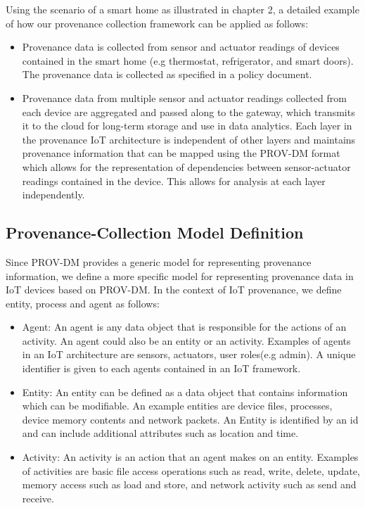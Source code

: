 Using the scenario of a smart home as illustrated in chapter 2, a detailed example of how our provenance collection framework can be applied as follows:

\begin{itemize}

\item Provenance data is collected from sensor and actuator readings of devices contained in the smart home (e.g thermostat, refrigerator, and smart doors). The provenance data is collected as specified in a policy document. 

\item Provenance data from multiple sensor and actuator readings collected from each device are aggregated and passed along to the gateway, which transmits it to the cloud for long-term storage and use in data analytics. Each layer in the provenance IoT architecture is independent of other layers and maintains provenance information that can be mapped using the PROV-DM format which allows for the representation of dependencies between sensor-actuator readings contained in the device. This allows for analysis at each layer independently. 

\end{itemize}





\subsection{Provenance-Collection Model Definition}

 Since PROV-DM provides a generic model for representing provenance information, we define a more specific model for representing provenance data in IoT devices based on  PROV-DM. In the context of IoT provenance, we define entity, process and agent as follows:

\begin{itemize}

\item Agent: An agent is any data object that is responsible for the actions of an activity. An agent could also be an entity or an activity. Examples of agents in an IoT architecture are sensors, actuators, user roles(e.g admin). A unique identifier is given to each agents contained in an IoT framework.

\item Entity:  An entity can be defined as a data object that contains information which can be modifiable. An example entities are device files, processes, device memory contents and network packets. An Entity is identified by an id and can include additional attributes such as location and time.

\item Activity: An activity is an action that an agent makes on an entity. Examples of activities are basic file access operations such as read, write, delete, update, memory access such as load and store, and network activity such as send and receive. 


\end{itemize}


